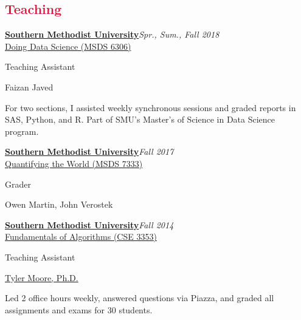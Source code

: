 \documentclass[margin, 10pt]{res} %
\newcommand{\Year}[1]{\emph{#1}}
\newcommand{\uni}[1]{\textbf{#1}}
\newcommand{\eventYear}[2]{\uni{#1}\hfill{\Year{#2}}\\}
\let\oldsection\section
\renewcommand{\section}[1]{\oldsection{\textcolor{crimson}{#1}}}
\newcommand{\SMU}{\href{https://www.smu.edu/}{Southern Methodist University}}
\begin{document}
\begin{resume}
\vspace{10em}

\section{Teaching}

\begin{samepage}
\eventYear{\SMU}{Spr., Sum., Fall 2018}
\href{https://datascience.smu.edu/academics/curriculum/coursedescriptions/#data-science}{Doing Data Science (MSDS 6306)}
\begin{description}[noitemsep, labelindent=1em]
\item[Role:] Teaching Assistant
\item[Professor:] Faizan Javed
\item For two sections, I assisted weekly synchronous sessions and graded reports in SAS, Python, and R. Part of SMU's Master's of Science in Data Science program.
\end{description}
\end{samepage}

\begin{samepage}
\eventYear{\SMU}{Fall 2017}
\href{https://datascience.smu.edu/academics/curriculum/coursedescriptions/#quantifying}{Quantifying the World (MSDS 7333)}
\begin{description}[noitemsep, labelindent=1em]
\item[Role:] Grader
\item[Professor:] Owen Martin, John Verostek
\end{description}
\end{samepage}

\begin{samepage}
\eventYear{\SMU}{Fall 2014}
\href{https://tylermoore.ens.utulsa.edu/courses/cse3353/}{Fundamentals of Algorithms (CSE 3353)}
\begin{description}[noitemsep, labelindent=1em]
\item[Role:] Teaching Assistant
\item[Professor:] \href{https://tylermoore.ens.utulsa.edu}{Tyler Moore, Ph.D.}
\item Led 2 office hours weekly, answered questions via Piazza, and graded all assignments and exams for 30 students.
\end{description}
\end{samepage}




\end{resume}
\end{document}
